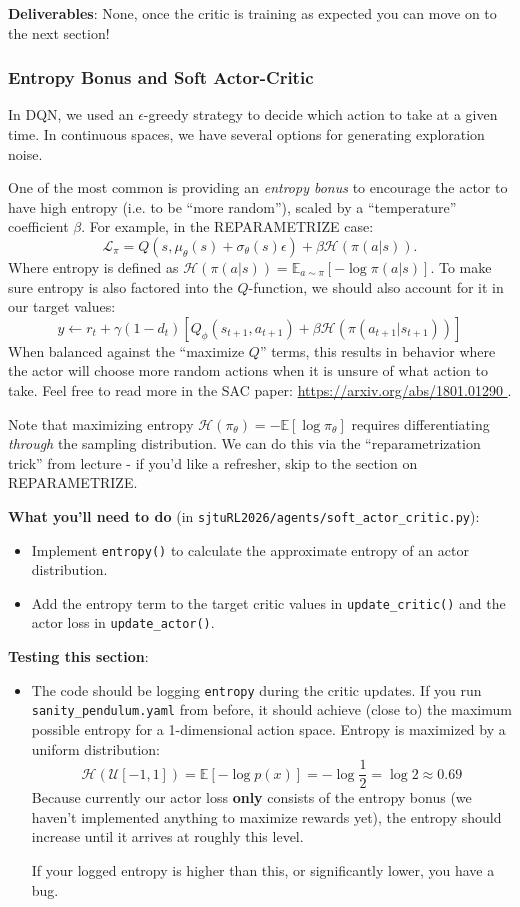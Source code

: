 \textbf{Deliverables}: None, once the critic is training as expected you can move on to the next section!

\subsubsection{Entropy Bonus and Soft Actor-Critic}
In DQN, we used an $\epsilon$-greedy strategy to decide which action to take at a given time. In continuous spaces, we have several options for generating exploration noise.

One of the most common is providing an \textit{entropy bonus} to encourage the actor to have high entropy (i.e. to be ``more random''), scaled by a ``temperature'' coefficient $\beta$. For example, in the REPARAMETRIZE case:
\[\mathcal L_\pi = Q(s, \mu_\theta(s) + \sigma_\theta(s)\epsilon) + \beta\mathcal{H}(\pi(a|s)).\]
Where entropy is defined as $\mathcal H(\pi(a|s)) = \mathbb{E}_{a \sim \pi}\left[-\log\pi(a|s)\right]$. To make sure entropy is also factored into the $Q$-function, we should also account for it in our target values:
\[y \gets r_t + \gamma(1-d_t)\left[Q_\phi(s_{t+1}, a_{t+1}) + \beta\mathcal{H}(\pi(a_{t+1}|s_{t+1}))\right]\]
When balanced against the ``maximize $Q$'' terms, this results in behavior where the actor will choose more random actions when it is unsure of what action to take.
Feel free to read more in the SAC paper: {\url{https://arxiv.org/abs/1801.01290 }}.

Note that maximizing entropy $\mathcal{H}(\pi_\theta) = -\mathbb{E}[\log \pi_\theta]$ requires differentiating \textit{through} the sampling distribution. We can do this via the ``reparametrization trick'' from lecture - if you'd like a refresher, skip to the section on REPARAMETRIZE.

\textbf{What you'll need to do} (in \verb|sjtuRL2026/agents/soft_actor_critic.py|):
\begin{itemize}
    \item Implement \verb|entropy()| to calculate the approximate entropy of an actor distribution.
    \item Add the entropy term to the target critic values in \verb|update_critic()| and the actor loss in \verb|update_actor()|.
\end{itemize}

\textbf{Testing this section}:
\begin{itemize}
    \item The code should be logging \verb|entropy| during the critic updates. If you run \verb|sanity_pendulum.yaml| from before, it should achieve (close to) the maximum possible entropy for a 1-dimensional action space. Entropy is maximized by a uniform distribution:
    \[\mathcal{H}(\mathcal{U}[-1, 1]) = \mathbb{E}[-\log p(x)] = -\log \frac{1}{2} = \log 2 \approx 0.69\]
    Because currently our actor loss \textbf{only} consists of the entropy bonus (we haven't implemented anything to maximize rewards yet), the entropy should increase until it arrives at roughly this level.

    If your logged entropy is higher than this, or significantly lower, you have a bug.
\end{itemize}

